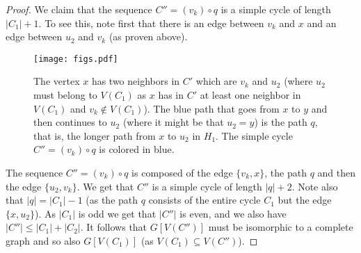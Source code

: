 \documentclass{article}
\theoremstyle{definition}
\begin{document}
\begin{proof}
We claim that the sequence $C'' = (v_k) \circ q$ is a simple cycle of length $|C_{1}| + 1$. To see this, note first that there is an edge between $v_k$ and $x$ and an edge between $u_2$ and $v_k$ (as proven above).
\begin{figure}[!ht]
	\centering
	\texttt{[image: figs.pdf]}
	\caption{The vertex $x$ has two neighbors in $C'$ which are $v_k$ and $u_2$ (where $u_2$ must belong to $V(C_1)$ as $x$ has in $C'$ at least one neighbor in $V(C_1)$ and $v_k \not\in V(C_1)$). The blue path that goes from $x$ to $y$ and then continues to $u_2$ (where it might be that $u_2 = y$) is the path $q$, that is, the longer path from $x$ to $u_2$ in $H_1$. The simple cycle $C'' = (v_k) \circ q$ is colored in blue.} \end{figure}
The sequence $C'' = (v_k) \circ q$ is composed of the edge $\{v_k,x\}$, the path $q$ and then the edge $\{u_2,v_k\}$. We get that $C''$ is a simple cycle of length $|q| + 2$. Note also that $|q| = |C_1| -1$ (as the path $q$ consists of the entire cycle $C_1$ but the edge $\{x,u_2\}$). As $|C_1|$ is odd we get that $|C''|$ is even, and we also have $|C''| \le |C_{1}| + |C_{2}|$. It follows that $G[V(C'')]$ must be isomorphic to a complete graph and so also $G[V(C_{1})]$ (as $V(C_{1}) \subseteq V(C'')$). \end{proof}
\end{document}
